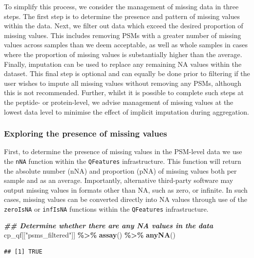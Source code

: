 \documentclass[9pt,a4paper,]{extarticle}
\newenvironment{Shaded}{\begin{snugshade}}{\end{snugshade}}
\newcommand{\DocumentationTok}[1]{\textcolor[rgb]{0.56,0.35,0.01}{\textbf{\textit{#1}}}}
\newcommand{\FunctionTok}[1]{\textcolor[rgb]{0.13,0.29,0.53}{\textbf{#1}}}
\newcommand{\NormalTok}[1]{#1}
\newcommand{\SpecialCharTok}[1]{\textcolor[rgb]{0.81,0.36,0.00}{\textbf{#1}}}
\newcommand{\StringTok}[1]{\textcolor[rgb]{0.31,0.60,0.02}{#1}}
\begin{document}
To simplify this process, we consider the management of missing data in three
steps. The first step is to determine the presence and pattern of missing values
within the data. Next, we filter out data which exceed the desired proportion of
missing values. This includes removing PSMs with a greater number of missing
values across samples than we deem acceptable, as well as whole samples in cases
where the proportion of missing values is substantially higher than the average.
Finally, imputation can be used to replace any remaining NA values within the
dataset. This final step is optional and can equally be done prior to filtering
if the user wishes to impute all missing values without removing any PSMs,
although this is not recommended. Further, whilst it is possible to complete
such steps at the peptide- or protein-level, we advise management of missing
values at the lowest data level to minimise the effect of implicit imputation
during aggregation.

\subsubsection{Exploring the presence of missing values}\label{exploring-the-presence-of-missing-values}

First, to determine the presence of missing values in the PSM-level data we use
the \texttt{nNA} function within the \texttt{QFeatures} infrastructure. This function will
return the absolute number (nNA) and proportion (pNA) of missing values both per
sample and as an average. Importantly, alternative third-party software may
output missing values in formats other than NA, such as zero, or infinite. In
such cases, missing values can be converted directly into NA values through use
of the \texttt{zeroIsNA} or \texttt{infIsNA} functions within the \texttt{QFeatures} infrastructure.

\begin{Shaded}
\begin{Highlighting}[]
\DocumentationTok{\#\# Determine whether there are any NA values in the data}
\NormalTok{cp\_qf[[}\StringTok{"psms\_filtered"}\NormalTok{]] }\SpecialCharTok{\%\textgreater{}\%}
  \FunctionTok{assay}\NormalTok{() }\SpecialCharTok{\%\textgreater{}\%}
  \FunctionTok{anyNA}\NormalTok{()}
\end{Highlighting}
\end{Shaded}

\begin{verbatim}
## [1] TRUE
\end{verbatim}
\end{document}

